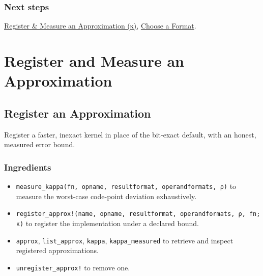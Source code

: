 \subsection{Next steps}



\label{3807517405601295309-dup6}{}


\href{workflow\_\allowbreak{}approximation.md}{Register \& Measure an Approximation (κ)}, \href{workflow\_\allowbreak{}choose\_\allowbreak{}format.md}{Choose a Format}.



\chapter{Register and Measure an Approximation}


\section{Register an Approximation}



\label{4380742141014598597}{}


Register a faster, inexact kernel in place of the bit-exact default, with an honest, measured error bound.



\subsection{Ingredients}



\label{13776634711169142479-dup5}{}


\begin{itemize}
\item \texttt{measure\_\allowbreak{}kappa(\allowbreak{}fn, opname, resultformat, operandformats, ρ)} to measure the worst-case code-point deviation exhaustively.


\item \texttt{register\_\allowbreak{}approx!(\allowbreak{}name, opname, resultformat, operandformats, ρ, fn; κ)} to register the implementation under a declared bound.


\item \texttt{approx}, \texttt{list\_\allowbreak{}approx}, \texttt{kappa}, \texttt{kappa\_\allowbreak{}measured} to retrieve and inspect registered approximations.


\item \texttt{unregister\_\allowbreak{}approx!} to remove one.

\end{itemize}


